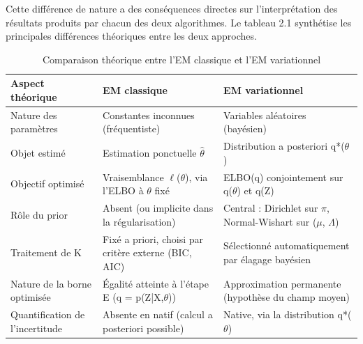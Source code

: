 Cette différence de nature a des conséquences directes sur l'interprétation des résultats produits par chacun des deux algorithmes. Le tableau 2.1 synthétise les principales différences théoriques entre les deux approches.

\begin{table}[H]
\centering
\small
\setlength{\tabcolsep}{0.14cm}
\begin{tabular}{|p{4.84cm}|p{4.84cm}|p{4.84cm}|}
\hline
\textbf{Aspect théorique} & \textbf{EM classique} & \textbf{EM variationnel} \\
\hline
Nature des paramètres & Constantes inconnues (fréquentiste) & Variables aléatoires (bayésien) \\
\hline
Objet estimé & Estimation ponctuelle $\hat{\theta }$ & Distribution a posteriori q*($\theta $) \\
\hline
Objectif optimisé & Vraisemblance $\ell $($\theta $), via l'ELBO à $\theta $ fixé & ELBO(q) conjointement sur q($\theta $) et q(Z) \\
\hline
Rôle du prior & Absent (ou implicite dans la régularisation) & Central : Dirichlet sur $\pi $, Normal-Wishart sur ($\mu $, $\Lambda $) \\
\hline
Traitement de K & Fixé a priori, choisi par critère externe (BIC, AIC) & Sélectionné automatiquement par élagage bayésien \\
\hline
Nature de la borne optimisée & Égalité atteinte à l'étape E (q = p(Z|X,$\theta $)) & Approximation permanente (hypothèse du champ moyen) \\
\hline
Quantification de l'incertitude & Absente en natif (calcul a posteriori possible) & Native, via la distribution q*($\theta $) \\
\hline
\end{tabular}
\caption{Comparaison théorique entre l'EM classique et l'EM variationnel}
\label{tab:2_1}
\end{table}

